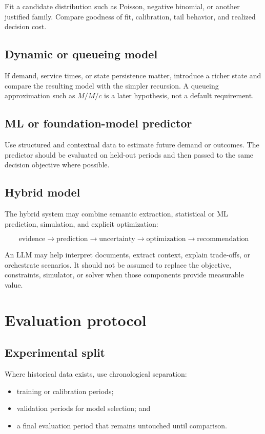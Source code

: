 \documentclass[11pt,a4paper]{article}
\newcommand{\equationnote}[1]{\begin{center}\colorbox{boxblue}{\parbox{0.92\linewidth}{\begin{equation*}#1\end{equation*}}}\end{center}}
\begin{document}
Fit a candidate distribution such as Poisson, negative binomial, or another justified family. Compare goodness of fit, calibration, tail behavior, and realized decision cost.

\subsection{Dynamic or queueing model}

If demand, service times, or state persistence matter, introduce a richer state and compare the resulting model with the simpler recursion. A queueing approximation such as $M/M/c$ is a later hypothesis, not a default requirement.

\subsection{ML or foundation-model predictor}

Use structured and contextual data to estimate future demand or outcomes. The predictor should be evaluated on held-out periods and then passed to the same decision objective where possible.

\subsection{Hybrid model}

The hybrid system may combine semantic extraction, statistical or ML prediction, simulation, and explicit optimization:

\equationnote{\text{evidence} \rightarrow \text{prediction} \rightarrow \text{uncertainty} \rightarrow \text{optimization} \rightarrow \text{recommendation}}

An LLM may help interpret documents, extract context, explain trade-offs, or orchestrate scenarios. It should not be assumed to replace the objective, constraints, simulator, or solver when those components provide measurable value.

\section{Evaluation protocol}

\subsection{Experimental split}

Where historical data exists, use chronological separation:
\begin{itemize}
  \item training or calibration periods;
  \item validation periods for model selection; and
  \item a final evaluation period that remains untouched until comparison.
\end{itemize}
\end{document}
